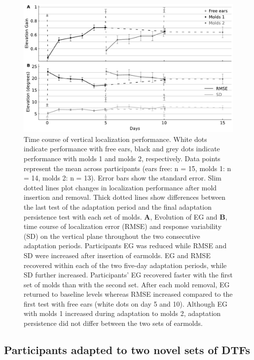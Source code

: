  \begin{figure}[ht]
	\includegraphics[width=18cm, center]{../Results/figures/fig5/fig5}
	\caption{Time course of vertical localization performance. White dots indicate performance with free ears, black and grey dots indicate performance with molds 1 and molds 2, respectively. Data points represent the mean across participants (ears free: n = 15, molds 1: n = 14, molds 2: n = 13). Error bars show the standard error. Slim dotted lines plot changes in localization performance after mold insertion and removal. Thick dotted lines show differences between the last test of the adaptation period and the final adaptation persistence test with each set of molds. \textbf{A}, Evolution of EG and \textbf{B}, time course of localization error (RMSE) and response variability (SD) on the vertical plane throughout the two consecutive adaptation periods. Participants EG was reduced while RMSE and SD were increased after insertion of earmolds. EG and RMSE recovered within each of the two five-day adaptation periods, while SD further increased. Participants' EG recovered faster with the first set of molds than with the second set. After each mold removal, EG returned to baseline levels whereas RMSE increased compared to the first test with free ears (white dots on day 5 and 10). Although EG with molds 1 increased during adaptation to molds 2, adaptation persistence did not differ between the two sets of earmolds.}
        \label{fig:adaptation}
\end{figure}

 
\subsection{Participants adapted to two novel sets of DTFs}
 
